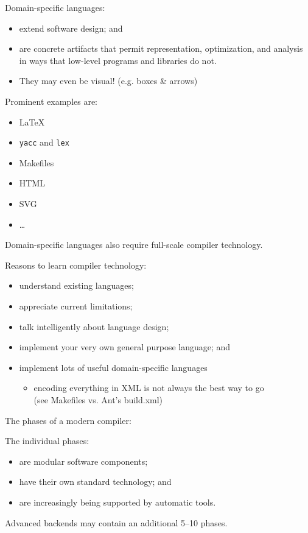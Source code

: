 \begin{slide*}
Domain-specific languages:
\begin{itemize}
\item extend software design; and
\item are concrete artifacts that permit representation, optimization, and analysis in ways
      that low-level programs and libraries do not.
\item They may even be visual! (e.g. boxes \& arrows) 
\end{itemize}
Prominent examples are:
\begin{itemize}
\item \LaTeX
\item {\tt yacc} and {\tt lex}
\item Makefiles
\item HTML
\item SVG
\item \ldots
\end{itemize}
Domain-specific languages also require full-scale compiler technology.
\vfil
\end{slide*}

\begin{slide*}
Reasons to learn compiler technology:
\begin{itemize}
\item understand existing languages;
\item appreciate current limitations;
\item talk intelligently about language design;
\item implement your very own general purpose language; and
\item implement lots of useful domain-specific languages
\begin{itemize}
\item encoding everything in XML is not always the best way to go\\
	(see Makefiles vs. Ant's build.xml)  
\end{itemize}
\end{itemize}
\vfil
\end{slide*}
 
\begin{slide*}
The phases of a modern compiler:\\

\begin{center}
\end{center}

The individual phases:
\begin{itemize}
\item are modular software components;
\item have their own standard technology; and
\item are increasingly being supported by automatic tools.
\end{itemize}

Advanced backends may contain an additional 5--10 phases.
\vfil
\end{slide*}
 
